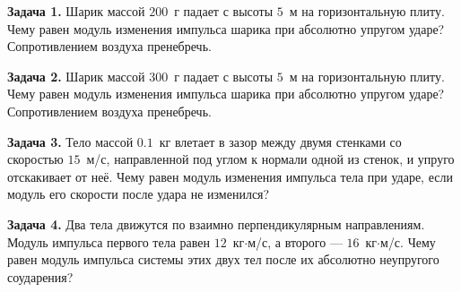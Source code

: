 \begin{taskbasic}[code={\label{task:momentum_v11_n3}}]
\textbf{Задача 1.} Шарик массой $200$~г падает с высоты $5$~м на горизонтальную плиту. Чему равен модуль изменения импульса шарика при абсолютно упругом ударе? Сопротивлением воздуха пренебречь.

\end{taskbasic}

\begin{taskbasic}[code={\label{task:momentum_v12_n3}}]
\textbf{Задача 2.} Шарик массой $300$~г падает с высоты $5$~м на горизонтальную плиту. Чему равен модуль изменения импульса шарика при абсолютно упругом ударе? Сопротивлением воздуха пренебречь.

\end{taskbasic}

\begin{taskbasic}[code={\label{task:momentum_v15_n3}}]
\textbf{Задача 3.} Тело массой $0.1$~кг влетает в зазор между двумя стенками со скоростью $15$~м/с, направленной под углом к нормали одной из стенок, и упруго отскакивает от неё. Чему равен модуль изменения импульса тела при ударе, если модуль его скорости после удара не изменился?

\end{taskbasic}

\begin{taskbasic}[code={\label{task:momentum_v16_n3}}]
\textbf{Задача 4.} Два тела движутся по взаимно перпендикулярным направлениям. Модуль импульса первого тела равен $12$~кг$\cdot$м/с, а второго — $16$~кг$\cdot$м/с. Чему равен модуль импульса системы этих двух тел после их абсолютно неупругого соударения?

\end{taskbasic}

